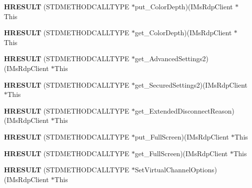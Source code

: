 \begin{DoxyCompactItemize}
{\bfseries H\+R\+E\+S\+U\+LT} (S\+T\+D\+M\+E\+T\+H\+O\+D\+C\+A\+L\+L\+T\+Y\+PE $\ast$put\+\_\+\+Color\+Depth)(I\+Ms\+Rdp\+Client $\ast$This
\item 
\mbox{\label{struct_i_ms_rdp_client_vtbl_a13906c5d3dc5bbb581ac394c53a0407b}} 
{\bfseries H\+R\+E\+S\+U\+LT} (S\+T\+D\+M\+E\+T\+H\+O\+D\+C\+A\+L\+L\+T\+Y\+PE $\ast$get\+\_\+\+Color\+Depth)(I\+Ms\+Rdp\+Client $\ast$This
\item 
\mbox{\label{struct_i_ms_rdp_client_vtbl_a919d4b4cc0c474ce049a24e4a75203e4}} 
{\bfseries H\+R\+E\+S\+U\+LT} (S\+T\+D\+M\+E\+T\+H\+O\+D\+C\+A\+L\+L\+T\+Y\+PE $\ast$get\+\_\+\+Advanced\+Settings2)(I\+Ms\+Rdp\+Client $\ast$This
\item 
\mbox{\label{struct_i_ms_rdp_client_vtbl_a79d99d44b5686a9288216761e0952279}} 
{\bfseries H\+R\+E\+S\+U\+LT} (S\+T\+D\+M\+E\+T\+H\+O\+D\+C\+A\+L\+L\+T\+Y\+PE $\ast$get\+\_\+\+Secured\+Settings2)(I\+Ms\+Rdp\+Client $\ast$This
\item 
\mbox{\label{struct_i_ms_rdp_client_vtbl_ae701b12d0d12a147d997a3029dddd8bb}} 
{\bfseries H\+R\+E\+S\+U\+LT} (S\+T\+D\+M\+E\+T\+H\+O\+D\+C\+A\+L\+L\+T\+Y\+PE $\ast$get\+\_\+\+Extended\+Disconnect\+Reason)(I\+Ms\+Rdp\+Client $\ast$This
\item 
\mbox{\label{struct_i_ms_rdp_client_vtbl_ad087891ba187eed1d70052decda696a6}} 
{\bfseries H\+R\+E\+S\+U\+LT} (S\+T\+D\+M\+E\+T\+H\+O\+D\+C\+A\+L\+L\+T\+Y\+PE $\ast$put\+\_\+\+Full\+Screen)(I\+Ms\+Rdp\+Client $\ast$This
\item 
\mbox{\label{struct_i_ms_rdp_client_vtbl_a8782773be21faa448f4f0abc306c54f5}} 
{\bfseries H\+R\+E\+S\+U\+LT} (S\+T\+D\+M\+E\+T\+H\+O\+D\+C\+A\+L\+L\+T\+Y\+PE $\ast$get\+\_\+\+Full\+Screen)(I\+Ms\+Rdp\+Client $\ast$This
\item 
\mbox{\label{struct_i_ms_rdp_client_vtbl_a1a1a8c0894f4c5586dbc6fb12e3b1ef9}} 
{\bfseries H\+R\+E\+S\+U\+LT} (S\+T\+D\+M\+E\+T\+H\+O\+D\+C\+A\+L\+L\+T\+Y\+PE $\ast$Set\+Virtual\+Channel\+Options)(I\+Ms\+Rdp\+Client $\ast$This
\item 

\end{DoxyCompactItemize}
